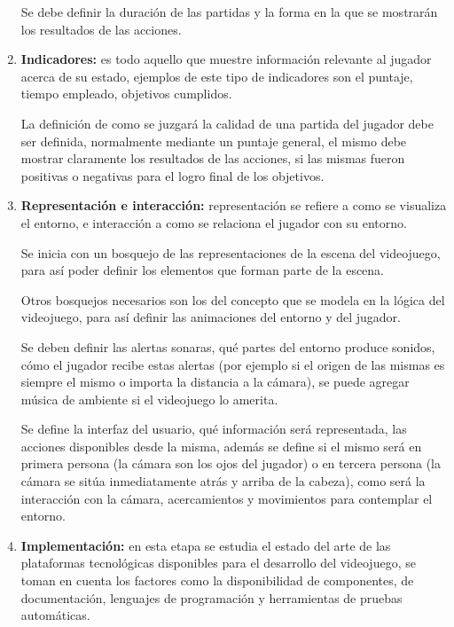 \begin{enumerate}
    Se debe definir la duración de las partidas y la forma en la que 
    se mostrarán los resultados de las acciones.

\item \textbf{Indicadores:} es todo aquello que muestre información relevante al
    jugador acerca de su estado, ejemplos de este tipo de indicadores son el
    puntaje, tiempo empleado, objetivos cumplidos. 

La definición de como se juzgará la calidad de una partida del jugador debe ser
definida, normalmente mediante un puntaje general, el mismo debe mostrar
claramente los resultados de las acciones, si las mismas fueron positivas o
negativas para el logro final de los objetivos.

\item \textbf{Representación e interacción:} representación se refiere a como se
    visualiza el entorno, e interacción a como se relaciona el jugador con su
    entorno.

Se inicia con un bosquejo de las representaciones de la escena del videojuego, para
así poder definir los elementos que forman parte de la escena.

Otros bosquejos necesarios son los del concepto que se modela en la lógica del
videojuego, para así definir las animaciones del entorno y del jugador.

Se deben definir las alertas sonaras, qué partes del entorno produce sonidos,
cómo el jugador recibe estas alertas (por ejemplo si el origen de las mismas es
siempre el mismo o importa la distancia a la cámara), se puede agregar música de
ambiente si el videojuego lo amerita.

Se define la interfaz del usuario, qué información será representada, las
acciones disponibles desde la misma, además se define si el mismo será en
primera persona (la cámara son los ojos del jugador) o en tercera persona (la
cámara se sitúa inmediatamente atrás y arriba de la cabeza), como será la
interacción con la cámara, acercamientos y movimientos para contemplar el
entorno.

\item \textbf{Implementación:} en esta etapa se estudia el estado del arte de las
    plataformas tecnológicas disponibles para el desarrollo del videojuego, se toman
    en cuenta los factores como la disponibilidad de componentes, de
    documentación, lenguajes de programación y herramientas de pruebas
    automáticas.


\end{enumerate}
